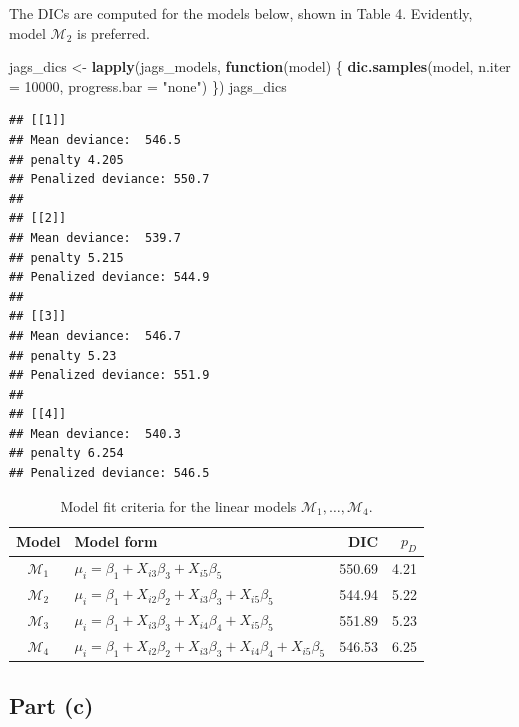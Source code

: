 \documentclass[
]{homework}
\newenvironment{Shaded}{\begin{snugshade}}{\end{snugshade}}
\newcommand{\AttributeTok}[1]{\textcolor[rgb]{0.13,0.29,0.53}{#1}}
\newcommand{\ControlFlowTok}[1]{\textcolor[rgb]{0.13,0.29,0.53}{\textbf{#1}}}
\newcommand{\DecValTok}[1]{\textcolor[rgb]{0.00,0.00,0.81}{#1}}
\newcommand{\FunctionTok}[1]{\textcolor[rgb]{0.13,0.29,0.53}{\textbf{#1}}}
\newcommand{\NormalTok}[1]{#1}
\newcommand{\OtherTok}[1]{\textcolor[rgb]{0.56,0.35,0.01}{#1}}
\newcommand{\StringTok}[1]{\textcolor[rgb]{0.31,0.60,0.02}{#1}}
\begin{document}
The DICs are computed for the models below, shown in Table 4. Evidently, model \(\mathcal M_2\) is preferred.

\begin{Shaded}
\begin{Highlighting}[]
\NormalTok{jags\_dics }\OtherTok{\textless{}{-}} \FunctionTok{lapply}\NormalTok{(jags\_models, }\ControlFlowTok{function}\NormalTok{(model) \{}
  \FunctionTok{dic.samples}\NormalTok{(model, }\AttributeTok{n.iter =} \DecValTok{10000}\NormalTok{, }\AttributeTok{progress.bar =} \StringTok{"none"}\NormalTok{)}
\NormalTok{\})}
\NormalTok{jags\_dics}
\end{Highlighting}
\end{Shaded}

\begin{verbatim}
## [[1]]
## Mean deviance:  546.5 
## penalty 4.205 
## Penalized deviance: 550.7 
## 
## [[2]]
## Mean deviance:  539.7 
## penalty 5.215 
## Penalized deviance: 544.9 
## 
## [[3]]
## Mean deviance:  546.7 
## penalty 5.23 
## Penalized deviance: 551.9 
## 
## [[4]]
## Mean deviance:  540.3 
## penalty 6.254 
## Penalized deviance: 546.5
\end{verbatim}

\begin{table}[H]
  \centering
  \begin{tabular}{clrr}
    \toprule
    Model & Model form & DIC & $p_D$ \\
    \midrule
    $\mathcal M_1$ & $\mu_i = \beta_1 + X_{i3}\beta_3 + X_{i5}\beta_5$ & 550.69 & 4.21 \\
    $\mathcal M_2$ & $\mu_i = \beta_1 + X_{i2}\beta_2 + X_{i3}\beta_3 + X_{i5}\beta_5$ & 544.94 & 5.22 \\
    $\mathcal M_3$ & $\mu_i = \beta_1 + X_{i3}\beta_3 + X_{i4}\beta_4 + X_{i5}\beta_5$ & 551.89 & 5.23 \\
    $\mathcal M_4$ & $\mu_i = \beta_1 + X_{i2}\beta_2 + X_{i3}\beta_3 + X_{i4}\beta_4 + X_{i5}\beta_5$ & 546.53 & 6.25 \\
    \bottomrule
  \end{tabular}
  \caption{Model fit criteria for the linear models $\mathcal M_1, \ldots, \mathcal M_4$.}
  \label{ex4-table-dic}
\end{table}

\subsection{Part (c)}\label{part-c-3}
\end{document}
